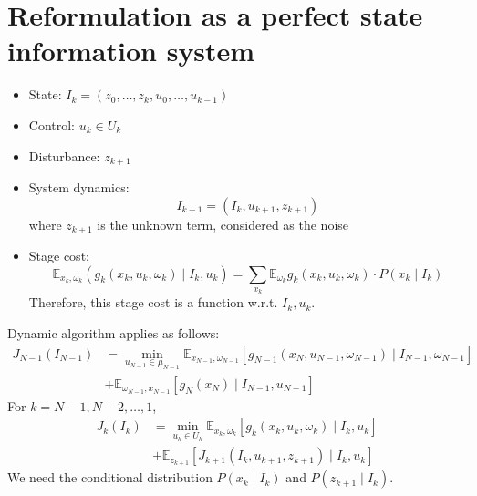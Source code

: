 \section{Reformulation as a perfect state information system}
\begin{itemize}
\item
State: $I_k=(z_0,\dots,z_k,u_0,\dots,u_{k-1})$
\item
Control: $u_k\in U_k$
\item
Disturbance: $z_{k+1}$
\item
System dynamics:
\[
I_{k+1} = (I_k,u_{k+1},z_{k+1})
\]
where $z_{k+1}$ is the unknown term, considered as the noise
\item
Stage cost:
\[
\mathbb{E}_{x_k,\omega_k}\left(g_k(x_k,u_k,\omega_k)\mid I_k,u_k\right)
=
\sum_{x_k}\mathbb{E}_{\omega_k}g_k(x_k,u_k,\omega_k)\cdot P(x_k\mid I_k)
\]
Therefore, this stage cost is a function w.r.t. $I_k,u_k$.
\end{itemize}
Dynamic algorithm applies as follows:
\begin{align*}
J_{N-1}(I_{N-1}) &= \min_{u_{N-1}\in \mu_{N-1}}
\mathbb{E}_{x_{N-1},\omega_{N-1}}\left[
g_{N-1}(x_N,u_{N-1},\omega_{N-1})\mid I_{N-1},\omega_{N-1}
\right]\\&
+\mathbb{E}_{\omega_{N-1},x_{N-1}}[g_N(x_N)\mid I_{N-1},u_{N-1}]
\end{align*}
For $k=N-1,N-2,\dots,1$,
\begin{align*}
J_{k}(I_k)&=\min_{u_k\in U_k}\mathbb{E}_{x_k,\omega_k}[g_k(x_k,u_k,\omega_k)\mid I_k,u_k]\\
&+\mathbb{E}_{z_{k+1}}\left[J_{k+1}(I_k,u_{k+1},z_{k+1})\mid I_k,u_k\right]
\end{align*}
We need the conditional distribution $P(x_k\mid I_k)$ and $P(z_{k+1}\mid I_k)$.


